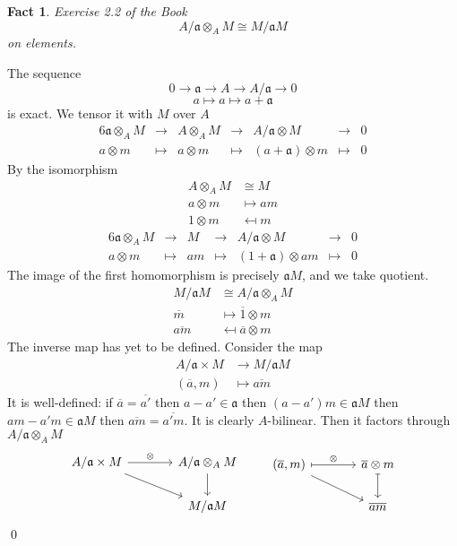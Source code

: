 \documentclass{article}
\newcommand{\mf}{\mathfrak}
\newcommand{\aaa}{\mf a}
\newtheorem{theorem}{Fact}[section]
\begin{document}
\begin{theorem}
Exercise 2.2 of the Book
\[
A/\aaa \otimes_A M \cong M/\aaa M
\]
on elements.
\end{theorem}
The sequence 
\[
0 \rightarrow \aaa \rightarrow A \rightarrow A/\aaa \rightarrow 0
\]
\[
a \mapsto a \mapsto a + \aaa
\]
is exact. We tensor it with $M$ over $A$
\begin{alignat*}{6}
\aaa \otimes_A M 
  & \rightarrow 
  & A \otimes_A M 
  & \rightarrow 
  & A/\aaa \otimes M     
  & \rightarrow 
  & 0 \\
a \otimes m      
  & \mapsto     
  & a \otimes m   
  & \mapsto     
  & (a + \aaa) \otimes m 
  & \mapsto 
  & 0
\end{alignat*}
By the isomorphism
\begin{align*}
A \otimes_A M & \cong M \\
a \otimes m & \mapsto am \\
1 \otimes m & \mapsfrom m
\end{align*}
\begin{alignat*}{6}
\aaa \otimes_A M 
  & \rightarrow 
  & M 
  & \rightarrow 
  & A/\aaa \otimes M     
  & \rightarrow 
  & 0 \\
a \otimes m      
  & \mapsto     
  & am   
  & \mapsto     
  & (1 + \aaa) \otimes am 
  & \mapsto 
  & 0
\end{alignat*}
The image of the first homomorphism is precisely $\aaa M$, and we take quotient.
\begin{align*}
M/\aaa M & \cong A/\aaa \otimes_A M \\
\overline{m} & \mapsto \overline{1} \otimes m \\
\overline{am} & \mapsfrom \overline{a} \otimes m
\end{align*}
The inverse map has yet to be defined. Consider the map
\begin{align*}
A/\aaa \times M & \longrightarrow M/\aaa M \\
(\overline{a}, m) & \longmapsto \overline{am}
\end{align*}
It is well-defined: if $\overline{a} = \overline{a'}$ then $a - a' \in \aaa$ then $(a - a')m \in \aaa M$ then $am - a'm \in \aaa M$ then $\overline{am} = \overline{a'm}$. It is clearly $A$-bilinear. Then it factors through $A/\aaa \otimes_A M$
\[
\begin{tikzcd}[column sep=large]
A/\aaa \times M \arrow{r}{\otimes} \arrow{rd} & A/\aaa \otimes_A M \arrow{d} \\
& M/\aaa M
\end{tikzcd}
%
\qquad
%
\begin{tikzcd}[column sep=large]
(\overline{a}, m) \arrow[r, mapsto, "\otimes"] \arrow{rd} & \overline{a} \otimes m \arrow[d, mapsto] \\
& \overline{am}
\end{tikzcd}
\]
\qed
\end{document}
